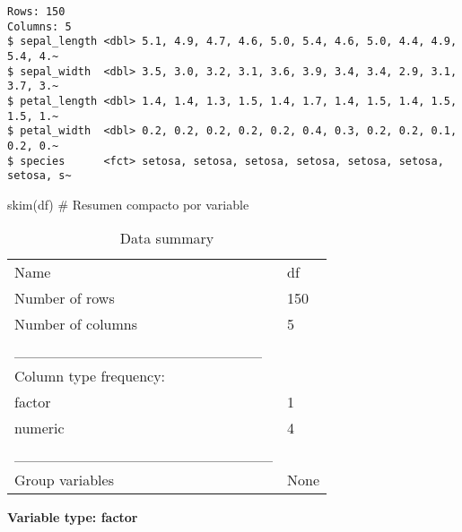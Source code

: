 \documentclass[
  spanish,
  11pt,
  a4paper,
  DIV=11,
  numbers=noendperiod]{scrartcl}
\newenvironment{Shaded}{\begin{snugshade}}{\end{snugshade}}
\newcommand{\CommentTok}[1]{\textcolor[rgb]{0.37,0.37,0.37}{#1}}
\newcommand{\FunctionTok}[1]{\textcolor[rgb]{0.28,0.35,0.67}{#1}}
\newcommand{\NormalTok}[1]{\textcolor[rgb]{0.00,0.23,0.31}{#1}}
\begin{document}
\begin{verbatim}
Rows: 150
Columns: 5
$ sepal_length <dbl> 5.1, 4.9, 4.7, 4.6, 5.0, 5.4, 4.6, 5.0, 4.4, 4.9, 5.4, 4.~
$ sepal_width  <dbl> 3.5, 3.0, 3.2, 3.1, 3.6, 3.9, 3.4, 3.4, 2.9, 3.1, 3.7, 3.~
$ petal_length <dbl> 1.4, 1.4, 1.3, 1.5, 1.4, 1.7, 1.4, 1.5, 1.4, 1.5, 1.5, 1.~
$ petal_width  <dbl> 0.2, 0.2, 0.2, 0.2, 0.2, 0.4, 0.3, 0.2, 0.2, 0.1, 0.2, 0.~
$ species      <fct> setosa, setosa, setosa, setosa, setosa, setosa, setosa, s~
\end{verbatim}

\begin{Shaded}
\begin{Highlighting}[numbers=left,,]
\FunctionTok{skim}\NormalTok{(df) }\CommentTok{\# Resumen compacto por variable}
\end{Highlighting}
\end{Shaded}

\begin{longtable}[]{@{}ll@{}}
\caption{Data summary}\tabularnewline
\toprule\noalign{}
\endfirsthead
\endhead
\bottomrule\noalign{}
\endlastfoot
Name & df \\
Number of rows & 150 \\
Number of columns & 5 \\
\_\_\_\_\_\_\_\_\_\_\_\_\_\_\_\_\_\_\_\_\_\_\_ & \\
Column type frequency: & \\
factor & 1 \\
numeric & 4 \\
\_\_\_\_\_\_\_\_\_\_\_\_\_\_\_\_\_\_\_\_\_\_\_\_ & \\
Group variables & None \\
\end{longtable}

\textbf{Variable type: factor}
\end{document}
